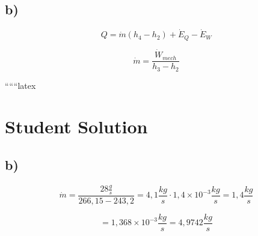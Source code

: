 

\subsection*{b)}

\begin{equation}
Q = \dot{m} (h_4 - h_2) + \dot{E}_Q - \dot{E}_W
\end{equation}

\begin{equation}
\dot{m} = \frac{\dot{W}_{mech}}{h_3 - h_2}
\end{equation}

``````latex


\section*{Student Solution}



\subsection*{b)}

\[
\dot{m} = \frac{28 \frac{g}{s}}{266,15-243,2} = 4,1 \frac{kg}{s} \cdot 1,4 \times 10^{-3} \frac{kg}{s} = 1,4 \frac{kg}{s}
\]

\[
= 1,368 \times 10^{-3} \frac{kg}{s} = 4,9742 \frac{kg}{s}
\]